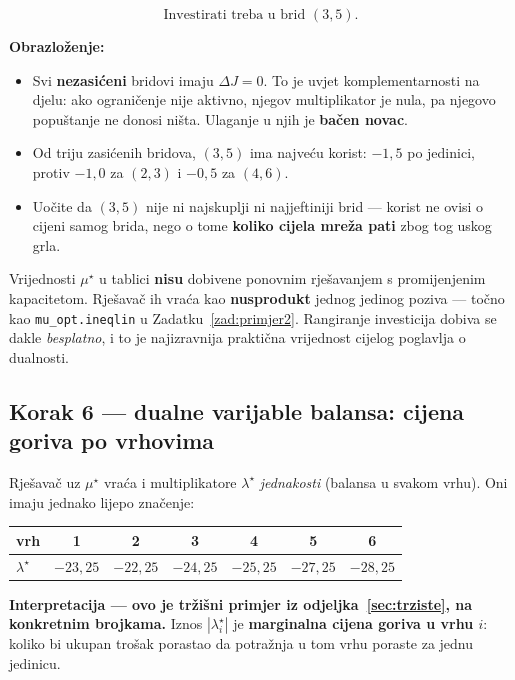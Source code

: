 \begin{zadatak}
\[
\boxed{\;\text{Investirati treba u brid } (3,5).\;}
\]

\textbf{Obrazloženje:}

\begin{itemize}
  \item Svi \textbf{nezasićeni} bridovi imaju $\Delta J = 0$. To je uvjet
        komplementarnosti na djelu: ako ograničenje nije aktivno, njegov
        multiplikator je nula, pa njegovo popuštanje ne donosi ništa. Ulaganje
        u njih je \textbf{bačen novac}.
  \item Od triju zasićenih bridova, $(3,5)$ ima najveću korist: $-1{,}5$ po
        jedinici, protiv $-1{,}0$ za $(2,3)$ i $-0{,}5$ za $(4,6)$.
  \item Uočite da $(3,5)$ nije ni najskuplji ni najjeftiniji brid --- korist
        ne ovisi o cijeni samog brida, nego o tome \textbf{koliko cijela mreža
        pati} zbog tog uskog grla.
\end{itemize}

\begin{napomena}
Vrijednosti $\mu^\star$ u tablici \textbf{nisu} dobivene ponovnim rješavanjem s
promijenjenim kapacitetom. Rješavač ih vraća kao \textbf{nusprodukt} jednog
jedinog poziva --- točno kao \texttt{mu\_opt.ineqlin} u
Zadatku~\ref{zad:primjer2}. Rangiranje investicija dobiva se dakle
\emph{besplatno}, i to je najizravnija praktična vrijednost cijelog poglavlja o
dualnosti.
\end{napomena}

\subsection*{Korak 6 --- dualne varijable balansa: cijena goriva po vrhovima}

Rješavač uz $\mu^\star$ vraća i multiplikatore $\lambda^\star$ \emph{jednakosti}
(balansa u svakom vrhu). Oni imaju jednako lijepo značenje:

\begin{center}
\begin{tabular}{lcccccc}
\toprule
\textbf{vrh} & 1 & 2 & 3 & 4 & 5 & 6 \\
\midrule
$\lambda^\star$ & $-23{,}25$ & $-22{,}25$ & $-24{,}25$ & $-25{,}25$
  & $-27{,}25$ & $-28{,}25$ \\
\bottomrule
\end{tabular}
\end{center}

\textbf{Interpretacija --- ovo je tržišni primjer iz
odjeljka~\ref{sec:trziste}, na konkretnim brojkama.} Iznos $|\lambda_i^\star|$
je \textbf{marginalna cijena goriva u vrhu $i$}: koliko bi ukupan trošak
porastao da potražnja u tom vrhu poraste za jednu jedinicu.


\end{zadatak}
